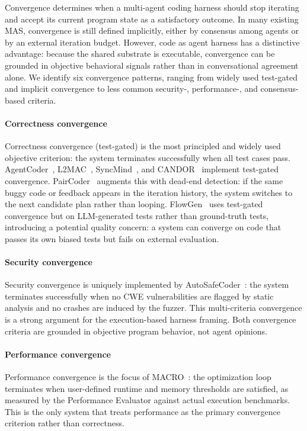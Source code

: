 \documentclass{llmxive}
\begin{document}
Convergence determines when a multi-agent coding harness should
stop iterating and accept its current program state as a
satisfactory outcome. In many existing MAS, convergence is still
defined implicitly, either by consensus among agents or by an
external iteration budget. However, code as agent harness has a
distinctive advantage: because the shared substrate is
executable, convergence can be grounded in objective behavioral
signals rather than in conversational agreement alone. We identify six convergence patterns, ranging from widely used test-gated and implicit convergence to less common security-, performance-, and consensus-based criteria.

\paragraph{Correctness convergence} Correctness convergence
(test-gated) is the most principled and widely used objective
criterion: the system terminates successfully when all test cases
pass. AgentCoder~\cite{huang2023agentcoder},
L2MAC~\cite{Holt2023L2MAC}, SyncMind~\cite{Guo2025SyncMind}, and
CANDOR~\cite{Xu2025Hallucination} implement test-gated
convergence. PairCoder~\cite{Zhang2024PairProgramming} augments
this with dead-end detection: if the same buggy code or feedback
appears in the iteration history, the system switches to the next
candidate plan rather than looping. FlowGen~\cite{Lin2025Soen101}
uses test-gated convergence but on LLM-generated tests rather
than ground-truth tests, introducing a potential quality concern:
a system can converge on code that passes its own biased tests
but fails on external evaluation.

\paragraph{Security convergence} Security convergence is uniquely
implemented by AutoSafeCoder~\cite{Nunez2024AutoSafeCoder}: the
system terminates successfully when no CWE vulnerabilities are
flagged by static analysis and no crashes are induced by the
fuzzer. This multi-criteria convergence is a strong argument for
the execution-based harness framing. Both convergence criteria
are grounded in objective program behavior, not agent opinions.

\paragraph{Performance convergence} Performance convergence is the
focus of MACRO~\cite{Rahman2025MACRO}: the optimization loop
terminates when user-defined runtime and memory thresholds are
satisfied, as measured by the Performance Evaluator against
actual execution benchmarks. This is the only system that treats
performance as the primary convergence criterion rather than
correctness.
\end{document}
